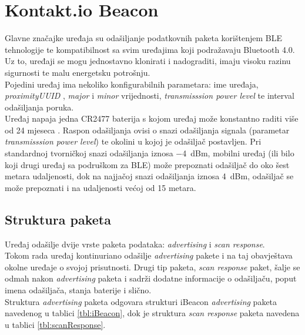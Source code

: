 \section*{Kontakt.io Beacon}

Glavne značajke uređaja su odašiljanje podatkovnih paketa korištenjem BLE tehnologije te kompatibilnost sa svim uređajima koji podražavaju Bluetooth 4.0. 
Uz to, uređaji se mogu jednostavno klonirati i nadograditi, imaju visoku razinu sigurnosti te malu energetsku potrošnju.
\\
Pojedini uređaj ima nekoliko konfigurabilnih parametara: ime uređaja, \textit{proximityUUID} , \textit{major} i \textit{minor} vrijednosti, \textit{transmisssion power level} te interval odašiljanja poruka.
\\
Uređaj napaja jedna CR2477 baterija s kojom uređaj može konstantno raditi više od 24 mjeseca \cite{kontaktDatasheet}. 
Raspon odašiljanja ovisi o snazi odašiljanja signala (parametar \textit{transmisssion power level}) te okolini u kojoj je odašiljač postavljen. 
Pri standardnoj tvorničkoj snazi odašiljanja iznosa \SI{-4}{~dBm}, mobilni uređaj (ili bilo koji drugi uređaj sa podruškom za BLE) može prepoznati odašiljač do oko šest metara udaljenosti, dok na najjačoj snazi odašiljanja iznosa \SI{4}{dBm}, odašiljač se može prepoznati i na udaljenosti većoj od 15 metara.

\subsection*{Struktura paketa}
Uređaj odašilje dvije vrste paketa podataka: \textit{advertising} i \textit{scan response}.
\\
Tokom rada uređaj kontinuriano odašilje \textit{advertising} pakete i na taj obavještava okolne uređaje o svojoj prisutnosti. 
Drugi tip paketa, \textit{scan response} paket, šalje se odmah nakon \textit{advertising} paketa i sadrži dodatne informacije o odašiljaču, poput imena odašiljača, stanja baterije i slično.
\\

Struktura \textit{advertising} paketa odgovara strukturi iBeacon \textit{advertising} paketa navedenog u tablici \ref{tbl:iBeacon}, dok je struktura \textit{scan response} paketa navedena u tablici \ref{tbl:scanResponse}.
\\

